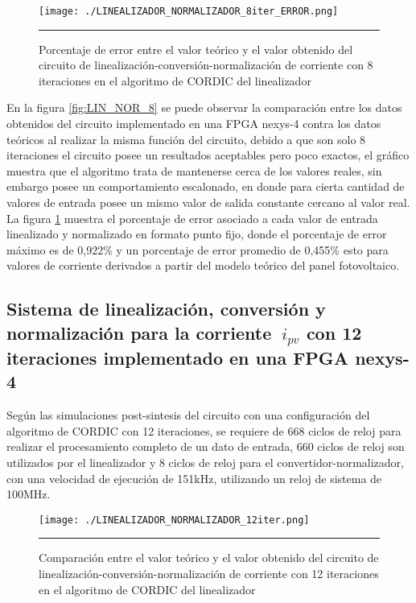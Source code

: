 \begin{figure}[H]
  \centering
    \texttt{[image: ./LINEALIZADOR\_NORMALIZADOR\_8iter\_ERROR.png]}
    \rule{35em}{0.5pt}
  \caption[Porcentaje de error entre el valor teórico y el valor obtenido del circuito de linealización-conversión-normalización de corriente con 8 iteraciones en el algoritmo de CORDIC del linealizador]{Porcentaje de error entre el valor teórico y el valor obtenido del circuito de linealización-conversión-normalización de corriente con 8 iteraciones en el algoritmo de CORDIC del linealizador}
  \label{fig:LIN_NOR_8_E}
\end{figure}

En la figura \ref{fig:LIN_NOR_8} se puede observar la comparación entre los datos obtenidos del circuito implementado en una FPGA nexys-4 contra los datos teóricos al realizar la misma función del circuito, debido a que son solo 8 iteraciones el circuito posee un resultados aceptables pero poco exactos, el gráfico muestra que el algoritmo trata de mantenerse cerca de los valores reales, sin embargo posee un comportamiento escalonado, en donde para cierta cantidad de valores de entrada posee un mismo valor de salida constante cercano al valor real. La figura \ref{fig:LIN_NOR_8_E} muestra el porcentaje de error asociado a cada valor de entrada linealizado y normalizado en formato punto fijo, donde el porcentaje de error máximo es de 0,922\% y un porcentaje de error promedio de 0,455\% esto para valores de corriente derivados a partir del modelo teórico del panel fotovoltaico. 
  

\subsection{Sistema de linealización, conversión y normalización para la corriente $\ i_{pv}$ con 12 iteraciones implementado en una FPGA nexys-4} 

Según las simulaciones post-sintesis del circuito con una configuración del algoritmo de CORDIC con 12 iteraciones, se requiere de 668 ciclos de reloj para realizar el procesamiento completo de un dato de entrada, 660 ciclos de reloj son utilizados por el linealizador y 8 ciclos de reloj para el convertidor-normalizador, con una velocidad de ejecución de 151kHz, utilizando un reloj de sistema de 100MHz.   

\begin{figure}[H]
  \centering
    \texttt{[image: ./LINEALIZADOR\_NORMALIZADOR\_12iter.png]}
    \rule{35em}{0.5pt}
  \caption[Comparación entre el valor teórico y el valor obtenido del circuito de linealización-conversión-normalización de corriente con 12 iteraciones en el algoritmo de CORDIC del linealizador]{Comparación entre el valor teórico y el valor obtenido del circuito de linealización-conversión-normalización de corriente con 12 iteraciones en el algoritmo de CORDIC del linealizador}
  \label{fig:LIN_NOR_12}
\end{figure}


